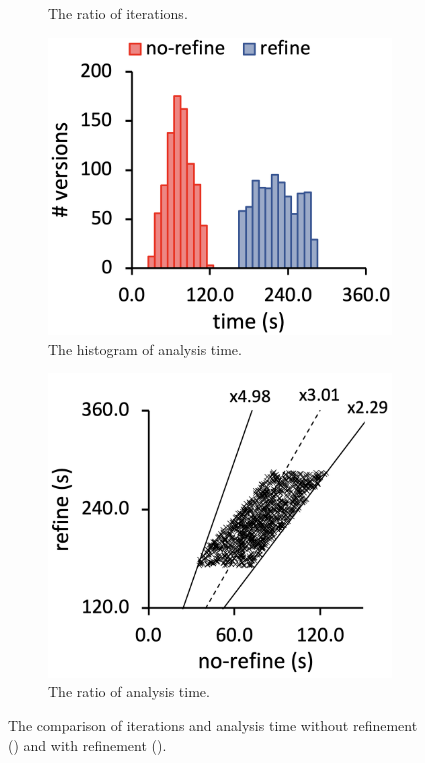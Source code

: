 \begin{figure}
\begin{subfigure}[b]{0.24\textwidth}
    \caption{The ratio of iterations.}
  \end{subfigure}
  \begin{subfigure}[b]{0.24\textwidth}
    \includegraphics[width=\textwidth]{img/compare-time}
    \caption{The histogram of analysis time.}
  \end{subfigure}
  \begin{subfigure}[b]{0.24\textwidth}
    \includegraphics[width=\textwidth]{img/ratio-time}
    \caption{The ratio of analysis time.}
  \end{subfigure}
  \caption{The comparison of iterations and analysis time without refinement
  () and with refinement ().}
  \label{fig:performance-compare}
  \vspace*{-1.5em}
\end{figure}

